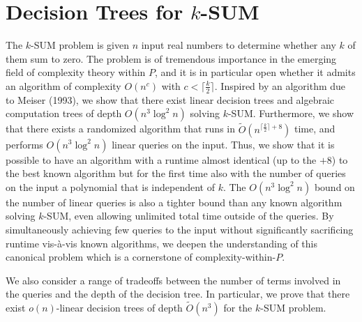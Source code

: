 \chapter{Decision Trees for $k$-SUM}

The $k$-SUM problem is given $n$ input real numbers to determine whether any
$k$ of them sum to zero. The problem is of tremendous importance in the
emerging field of complexity theory within $P$, and it is in particular open
whether it admits an algorithm of complexity $O(n^c)$ with $c<\lceil
\frac{k}{2} \rceil$. Inspired by an algorithm due to Meiser (1993), we show
that there exist linear decision trees and algebraic computation trees of depth
$O(n^3\log^2 n)$ solving $k$-SUM. Furthermore, we show that there exists a
randomized algorithm that runs in $\tilde{O}(n^{\lceil\frac{k}{2}\rceil+8})$ time,
and performs $O(n^3\log^2 n)$ linear queries on the input. Thus, we show that
it is possible to have an algorithm with a runtime almost identical (up to the
$+8$) to the best known algorithm but for the first time also with the number
of queries on the input a polynomial that is independent of $k$. The
$O(n^3\log^2 n)$ bound on the number of linear queries is also a tighter bound
than any known algorithm solving $k$-SUM, even allowing unlimited total time
outside of the queries.
By simultaneously achieving few queries to the input without significantly
sacrificing runtime vis-\`{a}-vis known algorithms, we deepen the understanding
of this canonical problem which is a cornerstone of complexity-within-$P$.

We also consider a range of tradeoffs between the number of terms involved in
the queries and the depth of the decision tree. In particular, we prove that
there exist $o(n)$-linear decision trees of depth $\tilde{O}(n^3)$ for the
$k$-SUM problem.






